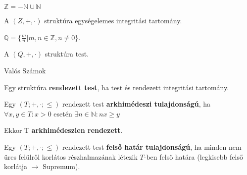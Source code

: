 \begin{frame}
\begin{tcolorbox}[title={Def.: Egész számok}]
  $\mathbb{Z} = -\mathbb{N} \cup \mathbb{N}$
\end{tcolorbox}

\begin{tcolorbox}[title={Ész}]
  A $(Z, +, {\cdot})$ struktúra egységelemes integritási tartomány.
\end{tcolorbox}

\begin{tcolorbox}[title={Def.: Racionális számok}]
  $\mathbb{Q} = \{\frac{m}{n} | m,n \in \mathbb{Z}, n \neq 0 \}$.
\end{tcolorbox}

\begin{tcolorbox}[title={Ész}]
  A $(Q, +, {\cdot})$ struktúra test.
\end{tcolorbox}
\end{frame}

\begin{frame}
\begin{tcolorbox}
{\Huge Valós Számok}
\end{tcolorbox}
\end{frame}

\begin{frame}
\begin{tcolorbox}[title={Def.: Rendezett test}]
  Egy struktúra \textbf{rendezett test}, ha test és rendezett integritási tartomány.
\end{tcolorbox}

\begin{tcolorbox}[title={Def.: Arkhimédészi tulajdonság}]
  Egy $(T; +, {\cdot}; {\leq})$ rendezett test \textbf{arkhimédeszi tulajdonságú}, ha\\
  ${\forall}x, y \in T : x > 0$ esetén ${\exists}n \in \mathbb{N} : nx \geq y$\\
  \msmallskip

  Ekkor T \textbf{arkhimédeszien rendezett}.
\end{tcolorbox}

\begin{tcolorbox}[title={Def.: Felső határ tulajdonság}]
  Egy $(T; +, {\cdot}; {\leq})$ rendezett test \textbf{felső határ tulajdonságú}, ha minden nem üres felülről korlátos részhalmazának létezik $T$-ben felső határa (legkisebb felső korlátja $\rightarrow$ Supremum).
\end{tcolorbox}
\end{frame}

